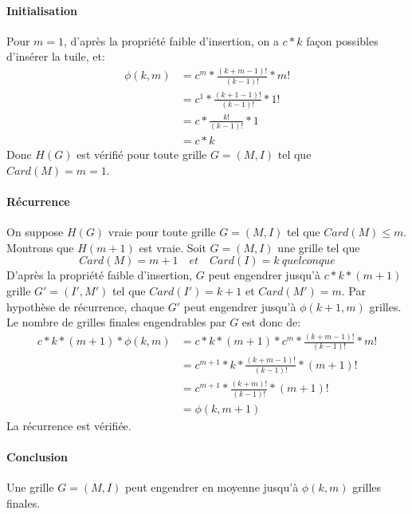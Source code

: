 \documentclass[10pt]{article}
\begin{document}
	\paragraph{Initialisation}
	Pour $m=1$, d'après la propriété faible d'insertion, on a $\boxed{c * k}$ façon possibles d'insérer la tuile, et:
	  \begin{equation} \label{eq2}
	    \begin{split}
	      \phi(k, m) & = c^m * \frac{(k + m - 1)!}{(k - 1)!} * m! \\
			& = c^1 * \frac{(k + 1 - 1)!}{(k - 1)!} * 1! \\
			& = c * \frac{k!}{(k - 1)!} * 1 \\
			& = c * k
	    \end{split}
	  \end{equation}
	  Donc $H(G)$ est vérifié pour toute grille $G=(M, I)$ tel que $Card(M) = m = 1$.
	\paragraph{Récurrence}
	  On suppose $H(G)$ vraie pour toute grille $G=(M, I)$ tel que $Card(M) \leq m$.
	  \newline
	  Montrons que $H(m+1)$ est vraie.
	  \newline
	  Soit $G=(M, I)$ une grille tel que $$Card(M)=m+1\quad et \quad Card(I)=k\ quelconque$$
	  D'après la propriété faible d'insertion, $G$ peut engendrer jusqu'à $c*k*(m+1)$
	  grille $G'=(I', M')$ tel que $Card(I') = k + 1$ et $Card(M') = m$.
	  Par hypothèse de récurrence, chaque $G'$ peut engendrer jusqu'à $\phi(k + 1, m)$ grilles.
	  Le nombre de grilles finales engendrables par $G$ est donc de:
	  \begin{equation} \label{eq3}
	    \begin{split}
	      c * k * (m + 1) * \phi(k, m) & = c * k * (m + 1) * c^m * \frac{(k + m - 1)!}{(k - 1)!} * m! \\
					  & = c^{m + 1} * k * \frac{(k + m - 1)!}{(k - 1)!} * (m + 1)! \\
					  & = c^{m + 1} * \frac{(k + m)!}{(k - 1)!} * (m + 1)! \\
					  & = \boxed{\phi(k, m + 1)}
	    \end{split}
	  \end{equation}
	  La récurrence est vérifiée.
	\paragraph{Conclusion}
	  Une grille $G=(M, I)$ peut engendrer en moyenne jusqu'à $\phi(k, m)$ grilles finales.
\end{document}
